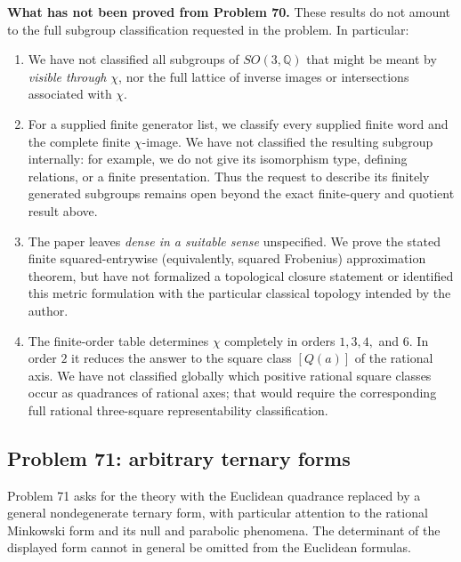 \documentclass[11pt]{article}
\begin{document}
\medskip
\noindent\textbf{What has not been proved from Problem 70.}
These results do not amount to the full subgroup classification requested in
the problem.  In particular:
\begin{enumerate}
\item We have not classified all subgroups of \(SO(3,\mathbb Q)\) that might
be meant by \emph{visible through \(\chi\)}, nor the full lattice of inverse
images or intersections associated with \(\chi\).
\item For a supplied finite generator list, we classify every supplied finite
word and the complete finite \(\chi\)-image.  We have not classified the
resulting subgroup internally: for example, we do not give its isomorphism
type, defining relations, or a finite presentation.  Thus the request to
describe its finitely generated subgroups remains open beyond the exact
finite-query and quotient result above.
\item The paper leaves \emph{dense in a suitable sense} unspecified.  We prove
the stated finite squared-entrywise (equivalently, squared Frobenius)
approximation theorem, but have not formalized a topological closure statement
or identified this metric formulation with the particular classical topology
intended by the author.
\item The finite-order table determines \(\chi\) completely in orders
\(1,3,4,\) and \(6\).  In order \(2\) it reduces the answer to the square
class \([Q(a)]\) of the rational axis.  We have not classified globally which
positive rational square classes occur as quadrances of rational axes; that
would require the corresponding full rational three-square representability
classification.
\end{enumerate}

\clearpage
\subsection{Problem 71: arbitrary ternary forms}

Problem 71 asks for the theory with the Euclidean quadrance replaced by a
general nondegenerate ternary form, with particular attention to the rational
Minkowski form and its null and parabolic phenomena.  The determinant of the
displayed form cannot in general be omitted from the Euclidean formulas.
\end{document}
